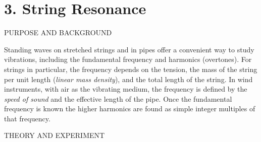 \documentclass[11pt]{NSF}
\begin{document}
     
\section{3. String Resonance}

PURPOSE AND BACKGROUND

Standing waves on stretched strings and in pipes offer a convenient way to
study vibrations, including the fundamental frequency and harmonics
(overtones). For strings in particular, the frequency depends on the tension,
the mass of the string per unit length ({\em linear mass density}), 
and the total length of the string.
In wind instruments, with air as the vibrating medium, the frequency is defined
by the {\em speed of sound} and the effective length of the pipe. Once the
fundamental frequency is known the higher harmonics are found as simple integer
multiples of that frequency.

THEORY AND EXPERIMENT
\end{document}
